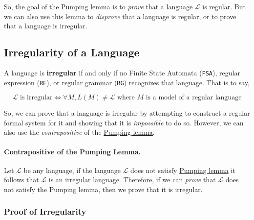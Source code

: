 So, the goal of the Pumping lemma is to \textit{prove} that a language $\mathcal{L}$ is regular. But we can also use this lemma to \textit{disprove} that a language is regular, or to prove that a language is irregular.

\subsection{Irregularity of a Language}

A language is \textbf{irregular} if and only if no Finite State Automata (\texttt{FSA}), regular expression (\texttt{RE}), or regular grammar (\texttt{RG}) recognizes that language. That is to say, 

\[
    \mathcal{L} \text{ is irregular} \Longleftrightarrow \forall M, L(M)\neq \mathcal{L} \text{ where $M$ is a model of a regular language}
\]

So, we can prove that a language is irregular by attempting to construct a regular formal system for it and showing that it is \textit{impossible} to do so. However, we can also use the \textit{contrapositive} of the \hyperref[pumping_lemma_defn]{Pumping lemma}.

\paragraph{Contrapositive of the Pumping Lemma.}

Let $\mathcal{L}$ be any language, if the language $\mathcal{L}$ does not satisfy \hyperref[pumping_lemma_defn]{Pumping lemma} it follows that $\mathcal{L}$ is an irregular language. Therefore, if we can \textit{prove} that $\mathcal{L}$ does not satisfy the Pumping lemma, then we prove that it is irregular.

\subsubsection{Proof of Irregularity}

